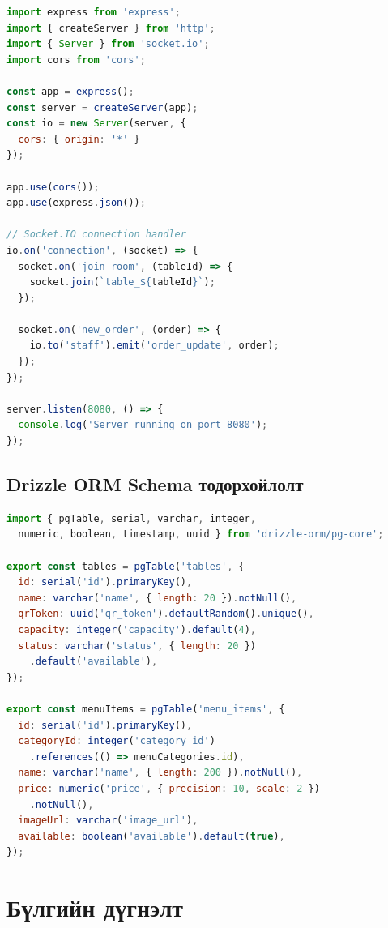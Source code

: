 \begin{lstlisting}[language=JavaScript, caption={Express серверийн эхлүүлэх код}, label={lst:server}]
import express from 'express';
import { createServer } from 'http';
import { Server } from 'socket.io';
import cors from 'cors';

const app = express();
const server = createServer(app);
const io = new Server(server, {
  cors: { origin: '*' }
});

app.use(cors());
app.use(express.json());

// Socket.IO connection handler
io.on('connection', (socket) => {
  socket.on('join_room', (tableId) => {
    socket.join(`table_${tableId}`);
  });

  socket.on('new_order', (order) => {
    io.to('staff').emit('order_update', order);
  });
});

server.listen(8080, () => {
  console.log('Server running on port 8080');
});
\end{lstlisting}

\subsection{Drizzle ORM Schema тодорхойлолт}

\begin{lstlisting}[language=JavaScript, caption={Drizzle ORM schema жишээ}, label={lst:drizzle}]
import { pgTable, serial, varchar, integer,
  numeric, boolean, timestamp, uuid } from 'drizzle-orm/pg-core';

export const tables = pgTable('tables', {
  id: serial('id').primaryKey(),
  name: varchar('name', { length: 20 }).notNull(),
  qrToken: uuid('qr_token').defaultRandom().unique(),
  capacity: integer('capacity').default(4),
  status: varchar('status', { length: 20 })
    .default('available'),
});

export const menuItems = pgTable('menu_items', {
  id: serial('id').primaryKey(),
  categoryId: integer('category_id')
    .references(() => menuCategories.id),
  name: varchar('name', { length: 200 }).notNull(),
  price: numeric('price', { precision: 10, scale: 2 })
    .notNull(),
  imageUrl: varchar('image_url'),
  available: boolean('available').default(true),
});
\end{lstlisting}

\section{Бүлгийн дүгнэлт}

